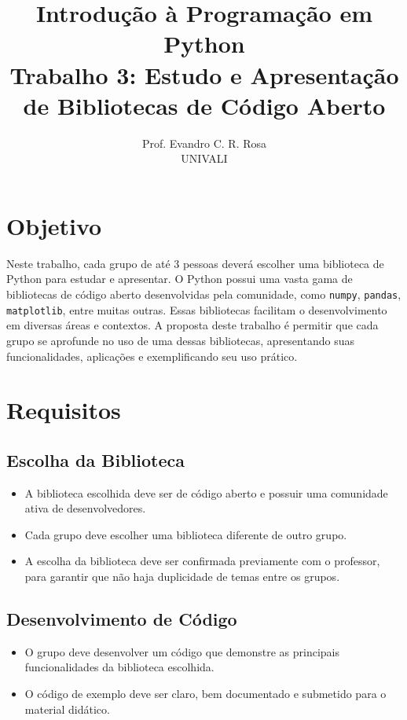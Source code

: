 \documentclass[12pt]{article}
\title{Introdução à Programação em Python\\
\large Trabalho 3: Estudo e Apresentação de Bibliotecas de Código Aberto}
\author{Prof. Evandro C. R. Rosa\\UNIVALI}
\date{}
\begin{document}
\maketitle

\section*{Objetivo}
Neste trabalho, cada grupo de até 3 pessoas deverá escolher uma biblioteca de Python para estudar e apresentar. O Python possui uma vasta gama de bibliotecas de código aberto desenvolvidas pela comunidade, como \texttt{numpy}, \texttt{pandas}, \texttt{matplotlib}, entre muitas outras. Essas bibliotecas facilitam o desenvolvimento em diversas áreas e contextos. A proposta deste trabalho é permitir que cada grupo se aprofunde no uso de uma dessas bibliotecas, apresentando suas funcionalidades, aplicações e exemplificando seu uso prático.

\section*{Requisitos}
\subsection*{Escolha da Biblioteca}
\begin{itemize}
  \item A biblioteca escolhida deve ser de código aberto e possuir uma comunidade ativa de desenvolvedores.
  \item Cada grupo deve escolher uma biblioteca diferente de outro grupo.
  \item A escolha da biblioteca deve ser confirmada previamente com o professor, para garantir que não haja duplicidade de temas entre os grupos.
\end{itemize}

\subsection*{Desenvolvimento de Código}
\begin{itemize}
  \item O grupo deve desenvolver um código que demonstre as principais funcionalidades da biblioteca escolhida.
  \item O código de exemplo deve ser claro, bem documentado e submetido para o material didático.
\end{itemize}
\end{document}
